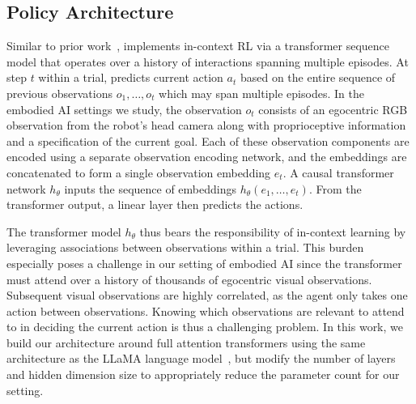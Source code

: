 \subsection{\method Policy Architecture}
\label{sec:architecture} 

Similar to prior work~\citep{grigsby2023amago,team2023human}, \method implements in-context RL via a transformer sequence model that operates over a history of interactions spanning multiple episodes.
At step $ t$ within a trial, \method predicts current action $ a_t$ based on the entire sequence of previous observations $ o_1, \dots , o_t$ which may span multiple episodes.
In the embodied AI settings we study, the observation $ o_t $ consists of an egocentric RGB observation from the robot's head camera along with proprioceptive information and a specification of the current goal.
Each of these observation components are encoded using a separate observation encoding network, and the embeddings are concatenated to form a single observation embedding $ e_t$.
A causal transformer network \citep{vaswani2023attention} $ h_\theta$ inputs the sequence of embeddings $ h_\theta(e_1, \dots, e_t)$. 
From the transformer output, a linear layer then predicts the actions.

The transformer model $ h_\theta$ thus bears the responsibility of in-context learning by leveraging associations between observations within a trial.
This burden especially poses a challenge in our setting of embodied AI since the transformer must attend over a history of thousands of egocentric visual observations. 
Subsequent visual observations are highly correlated, as the agent only takes one action between observations. 
Knowing which observations are relevant to attend to in deciding the current action is thus a challenging problem.
In this work, we build our architecture around full attention transformers using the same architecture as the LLaMA language model~\citep{touvron2023llamaoa}, but modify the number of layers and hidden dimension size to appropriately reduce the parameter count for our setting. 

